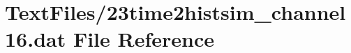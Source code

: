 \hypertarget{23time2histsim__channel16_8dat}{}\section{Text\+Files/23time2histsim\+\_\+channel16.dat File Reference}
\label{23time2histsim__channel16_8dat}
